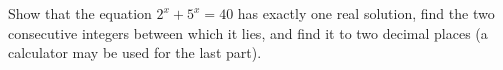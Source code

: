 Show that the equation $2^x+5^x=40$ has exactly one real solution, find the two consecutive integers between which it lies, and find it to two decimal places (a calculator may be used for the last part).
